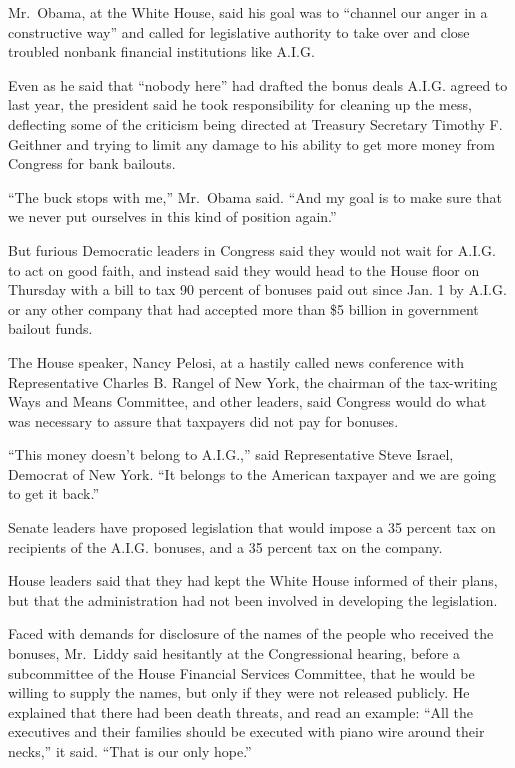 \documentclass[12pt,a4paper,onecolumn]{article}
\begin{document}
\begin{CJK*}{GBK}{song}
Mr.~Obama, at the White House, said his goal was to ``channel our anger in a constructive way'' and
called for legislative authority to take over and close troubled nonbank financial institutions like
A.I.G.

Even as he said that ``nobody here'' had drafted the bonus deals A.I.G. agreed to last year, the
president said he took responsibility for cleaning up the mess, deflecting some of the criticism
being directed at Treasury Secretary Timothy F. Geithner and trying to limit any damage to his
ability to get more money from Congress for bank bailouts.

``The buck stops with me,'' Mr.~Obama said. ``And my goal is to make sure that we never put
ourselves in this kind of position again.''

But furious Democratic leaders in Congress said they would not wait for A.I.G. to act on good faith,
and instead said they would head to the House floor on Thursday with a bill to tax 90 percent of
bonuses paid out since Jan. 1 by A.I.G. or any other company that had accepted more than \$5 billion
in government bailout funds.

The House speaker, Nancy Pelosi, at a hastily called news conference with Representative Charles B.
Rangel of New York, the chairman of the tax-writing Ways and Means Committee, and other leaders,
said Congress would do what was necessary to assure that taxpayers did not pay for bonuses.

``This money doesn't belong to A.I.G.,'' said Representative Steve Israel, Democrat of New York.
``It belongs to the American taxpayer and we are going to get it back.''

Senate leaders have proposed legislation that would impose a 35 percent tax on recipients of the
A.I.G. bonuses, and a 35 percent tax on the company.

House leaders said that they had kept the White House informed of their plans, but that the
administration had not been involved in developing the legislation.

Faced with demands for disclosure of the names of the people who received the bonuses, Mr.~Liddy
said hesitantly at the Congressional hearing, before a subcommittee of the House Financial Services
Committee, that he would be willing to supply the names, but only if they were not released
publicly. He explained that there had been death threats, and read an example: ``All the executives
and their families should be executed with piano wire around their necks,'' it said. ``That is our
only hope.''


\end{CJK*}
\end{document}
